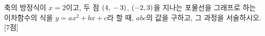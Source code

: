 축의 방정식이 $x=2$이고, 두 점 $(4{,}\mkern3mu -3)$, $(-2{,}\mkern3mu 3)$을 지나는 포물선을 그래프로 하는 이차함수의 식을 $y=ax^2+bx+c$라 할 때, $abc$의 값을 구하고, 그 과정을 서술하시오.  \mbox{[7점]}
